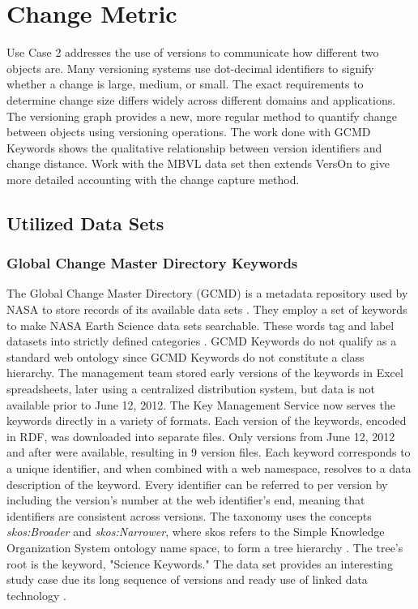 \section{Change Metric} \label{ch:distance}

Use Case 2 addresses the use of versions to communicate how different two objects are.
Many versioning systems use dot-decimal identifiers to signify whether a change is large, medium, or small.
The exact requirements to determine change size differs widely across different domains and applications.
The versioning graph provides a new, more regular method to quantify change between objects using versioning operations.
The work done with GCMD Keywords shows the qualitative relationship between version identifiers and change distance.
Work with the MBVL data set then extends VersOn to give more detailed accounting with the change capture method.

\subsection{Utilized Data Sets}

\subsubsection{Global Change Master Directory Keywords}

The Global Change Master Directory (GCMD) is a metadata repository used by NASA to store records of its available data sets \cite{Miled:2001:GCM:372202.372324}.
They employ a set of keywords to make NASA Earth Science data sets searchable.
These words tag and label datasets into strictly defined categories \cite{GCMDKey}.
GCMD Keywords do not qualify as a standard web ontology since GCMD Keywords do not constitute a class hierarchy.
The management team stored early versions of the keywords in Excel spreadsheets, later using a centralized distribution system, but data is not available prior to June 12, 2012.
The Key Management Service now serves the keywords directly in a variety of formats.
Each version of the keywords, encoded in RDF, was downloaded into separate files.
Only versions from June 12, 2012 and after were available, resulting in 9 version files.
Each keyword corresponds to a unique identifier, and when combined with a web namespace, resolves to a data description of the keyword.
Every identifier can be referred to per version by including the version's number at the web identifier's end, meaning that identifiers are consistent across versions.
The taxonomy uses the concepts \textit{skos:Broader} and \textit{skos:Narrower}, where skos refers to the Simple Knowledge Organization System ontology name space, to form a tree hierarchy \cite{skos}.
The tree's root is the keyword, "Science Keywords."
The data set provides an interesting study case due its long sequence of versions and ready use of linked data technology \cite{Stevens2016}.

